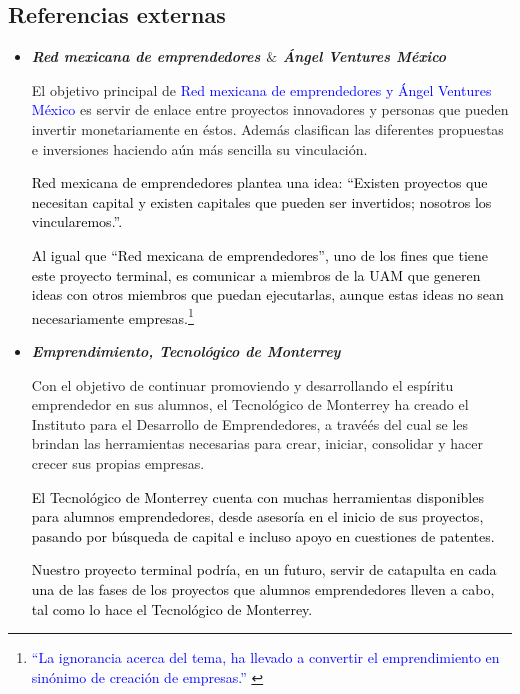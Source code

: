 \documentclass[11pt,letterpaper,titlepage]{article}
\begin{document}
\subsection{Referencias externas}
\begin{itemize}
\item \textit{\textbf{Red mexicana de emprendedores $\&$  \'Angel Ventures M\'exico}}

El objetivo principal de \textcolor{blue}{Red mexicana de emprendedores\cite{redmexicana} y  \'Angel Ventures M\'exico\cite{angel}} es servir de enlace entre proyectos innovadores y personas que pueden invertir monetariamente en \'estos. Adem\'as clasifican las diferentes propuestas e inversiones haciendo a\'un m\'as sencilla su vinculaci\'on.

\textcolor{black}{Red mexicana de emprendedores plantea una idea: ``Existen proyectos que necesitan capital y existen capitales que pueden ser invertidos; nosotros los vincularemos.''. }


\textcolor{black}{Al igual que ``Red mexicana de emprendedores'', uno de los fines que tiene este proyecto terminal, es comunicar a miembros de la UAM que generen ideas con otros miembros que puedan ejecutarlas, aunque estas ideas no sean necesariamente empresas.\footnote{\textcolor{blue}{``La ignorancia acerca del tema, ha llevado a convertir el emprendimiento en sin\'onimo de creaci\'on de empresas.'' \cite{desarrollo}}}}

\item \textit{\textbf{Emprendimiento, Tecnol\'ogico de Monterrey}}

Con el objetivo de continuar promoviendo y desarrollando el esp\'iritu emprendedor en sus alumnos, el Tecnol\'ogico de Monterrey ha creado el Instituto para el Desarrollo de Emprendedores\textcolor{blue}{\cite{itam}}, a travé\'es del cual se les brindan las herramientas necesarias para crear, iniciar, consolidar y hacer crecer sus propias empresas. 

\textcolor{black}{El Tecnol\'ogico de Monterrey cuenta con muchas herramientas disponibles para alumnos emprendedores, desde asesor\'ia en el inicio de sus proyectos, pasando por b\'usqueda de capital e incluso apoyo en cuestiones de patentes.}

\textcolor{black}{Nuestro proyecto terminal podr\'ia, en un futuro, servir de catapulta en cada una de las fases de los proyectos que alumnos emprendedores lleven a cabo, tal como lo hace el Tecnol\'ogico de Monterrey.}




\end{itemize}
\end{document}
